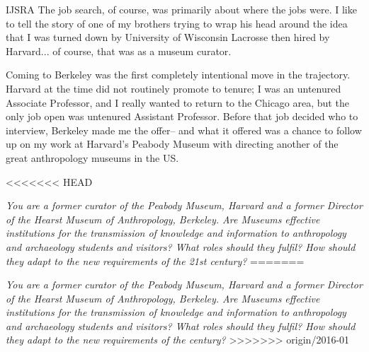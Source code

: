 \begin{labeling}{IJSRA}
The job search, of course, was primarily about where the jobs were. I like to tell the story of one of my brothers trying to wrap his head around the idea that I was turned down by University of Wisconsin Lacrosse then hired by Harvard... of course, that was as a museum curator. 

Coming to Berkeley was the first completely intentional move in the trajectory. Harvard at the time did not routinely promote to tenure; I was an untenured Associate Professor, and I really wanted to return to the Chicago area, but the only job open was untenured Assistant Professor. Before that job decided who to interview, Berkeley made me the offer-- and what it offered was a chance to follow up on my work at Harvard's Peabody Museum with directing another of the great anthropology museums in the US.
	
<<<<<<< HEAD
\item[IJSRA] \emph{You are a former curator of the Peabody Museum, Harvard and a former Director of the Hearst Museum of Anthropology, Berkeley. Are Museums effective institutions for the transmission of knowledge and information to anthropology and archaeology students and visitors? What roles should they fulfil? How should they adapt to the new requirements of the 21st century?}
=======
\item[IJSRA] \textit{You are a former curator of the Peabody Museum, Harvard and a former Director of the Hearst Museum of Anthropology, Berkeley. Are Museums effective institutions for the transmission of knowledge and information to anthropology and archaeology students and visitors? What roles should they fulfil? How should they adapt to the new requirements of the  century?}
>>>>>>> origin/2016-01


\end{labeling}
